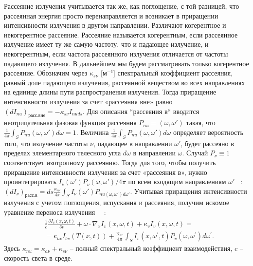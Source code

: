 Рассеяние излучения учитывается так же, как поглощение, с той разницей,
что рассеянная энергия просто перенаправляется и возникает в приращении
интенсивности излучения в другом направлении.
Различают когерентное и некогерентное рассеяние.
Рассеяние называется когерентным, если рассеянное излучение имеет ту же самую частоту,
что и падающее излучение, и некогерентным, если частота рассеянного
излучения отличается от частоты падающего излучения.
В дальнейшем мы будем рассматривать только когерентное рассеяние.
Обозначим через $\kappa_{s\nu}$ [$\text{м}^{-1}$] спектральный коэффициент рассеяния, равный
доле падающего излучения, рассеянной веществом во всех направлениях на
единице длины пути распространения излучения.
Тогда приращение интенсивности излучения за счет «рассеяния вне» равно
$(dI_{nu})_\text{расс.вне} = - \kappa_{s\nu}I_{nuds}$.
Для описания ``рассеяния в`` вводится неотрицательная фазовая функция рассеяния
$P_{nu} = (\omega, \omega')$ такая, что $\frac{1}{4\pi}\int_S P_{nu} (\omega, \omega')d\omega = 1$.
Величина $\frac{1}{4\pi}\int_S P_{nu} (\omega, \omega')d\omega$
определяет вероятность того, что излучение частоты $\nu$,
падающее в направлении $\omega'$,
будет рассеяно в пределах элементарного телесного угла $d\omega$ в направлении $\omega$.
Случай $P_\nu \equiv 1$ соответствует изотропному рассеянию.
Тогда для того, чтобы получить приращение интенсивности излучения за счет «рассеяния в», нужно
проинтегрировать $I_\nu(\omega')P_\nu(\omega,\omega')/4\pi$ по всем входящим направлениям
$\omega'$ ~\cite[283]{modest2013radiative}:
$(dI_\nu)_\text{расс.в} = ds \frac{\kappa_{s\nu}}{4\pi}\int_S I_\nu(\omega')P_{nu(\omega,\omega')d\omega'}$.
Учитывая приращения интенсивности излучения с учетом поглощения,
испускания и рассеяния, получим
искомое уравнение переноса излучения~\cite[272]{Ozisik1976} ~\cite[284]{modest2013radiative}:
\begin{equation}
    \label{eq:1_1:1}
    \begin{aligned}
        &\frac{1}{c} \frac{\partial I_v(x, \omega, t)}
        {\partial t}+\omega \cdot \nabla_x I_v(x, \omega, t)+\kappa_v I_v(x, \omega, t)=\\
        &=\mathrm{\kappa}_{a v} I_{b v}(T(x, t))+\frac{\mathrm{K}_{s v}}{4 \pi}
        \int_S I_v\left(x, \omega^{\prime}, t\right)
        P_v\left(\omega, \omega^{\prime}\right) d \omega^{\prime}.
    \end{aligned}
\end{equation}
Здесь $\kappa_{nu} = \kappa_{a\nu} + \kappa_{s\nu}$ -- полный
спектральный коэффициент взаимодействия,
$c$ -- скорость света в среде.


